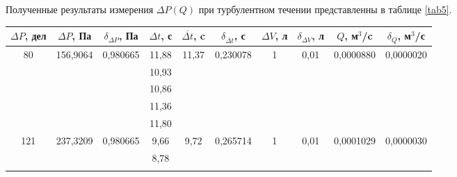 \documentclass[a4paper, 12pt]{article}
\begin{document}
\newpage
\par Полученные результаты измерения $\Delta{P}(Q)$ при турбулентном течении представленны в таблице \ref{tab5}.
\begin{table}[h!]
\begin{tabular}{|c|c|c|c|c|c|c|c|c|c|}
\hline
$\Delta{P}$, дел    & $\Delta{P}$, Па           & $\delta_{\Delta{P}}$, Па  & $\Delta{t}$, с & $\overline{\Delta{t}}$, c & $\delta_{\overline{\Delta{t}}}$, с & $\Delta{V}$, л     & $\delta_{\Delta{V}}$, л & $Q$, м$^3$/c      & $\delta_{Q}$, м$^3$/с \\ \hline
\multirow{5}{*}{80}  & \multirow{5}{*}{156,9064} & \multirow{5}{*}{0,980665} & 11,88 & \multirow{5}{*}{11,37}         & \multirow{5}{*}{0,230078}         & \multirow{5}{*}{1} & \multirow{5}{*}{0,01} & \multirow{5}{*}{0,0000880} & \multirow{5}{*}{0,0000020}   \\ \cline{4-4}
                     &                           &                           & 10,93 &                                &                                   &                    &                       &                            &                              \\ \cline{4-4}
                     &                           &                           & 10,86 &                                &                                   &                    &                       &                            &                              \\ \cline{4-4}
                     &                           &                           & 11,36 &                                &                                   &                    &                       &                            &                              \\ \cline{4-4}
                     &                           &                           & 11,80 &                                &                                   &                    &                       &                            &                              \\ \hline
\multirow{5}{*}{121} & \multirow{5}{*}{237,3209} & \multirow{5}{*}{0,980665} & 9,66  & \multirow{5}{*}{9,72}          & \multirow{5}{*}{0,265714}         & \multirow{5}{*}{1} & \multirow{5}{*}{0,01} & \multirow{5}{*}{0,0001029} & \multirow{5}{*}{0,0000030}   \\ \cline{4-4}
                     &                           &                           & 8,78  &                                &                                   &                    &                       &                            &                              \\ \cline{4-4}

\end{tabular}
\end{table}
\end{document}
